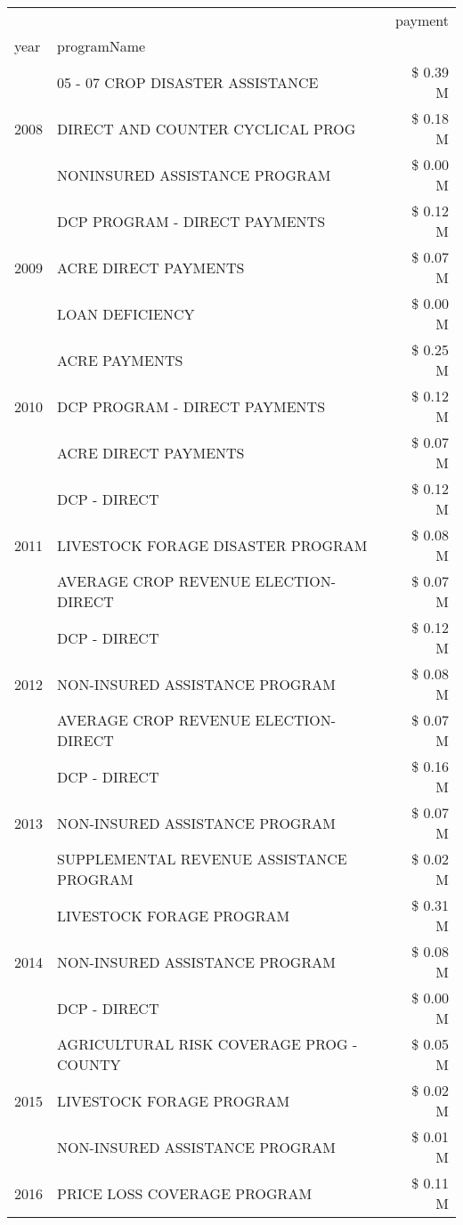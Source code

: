 \begin{tabular}{llr}
\toprule
 &  & payment \\
year & programName &  \\
\midrule
\multirow[t]{3}{*}{2008} & 05 - 07 CROP DISASTER ASSISTANCE & \$ 0.39 M \\
 & DIRECT AND COUNTER CYCLICAL PROG & \$ 0.18 M \\
 & NONINSURED ASSISTANCE PROGRAM & \$ 0.00 M \\
\cline{1-3}
\multirow[t]{3}{*}{2009} & DCP PROGRAM - DIRECT PAYMENTS & \$ 0.12 M \\
 & ACRE DIRECT PAYMENTS & \$ 0.07 M \\
 & LOAN DEFICIENCY & \$ 0.00 M \\
\cline{1-3}
\multirow[t]{3}{*}{2010} & ACRE PAYMENTS & \$ 0.25 M \\
 & DCP PROGRAM - DIRECT PAYMENTS & \$ 0.12 M \\
 & ACRE DIRECT PAYMENTS & \$ 0.07 M \\
\cline{1-3}
\multirow[t]{3}{*}{2011} & DCP - DIRECT & \$ 0.12 M \\
 & LIVESTOCK FORAGE DISASTER PROGRAM & \$ 0.08 M \\
 & AVERAGE CROP REVENUE ELECTION-DIRECT & \$ 0.07 M \\
\cline{1-3}
\multirow[t]{3}{*}{2012} & DCP - DIRECT & \$ 0.12 M \\
 & NON-INSURED ASSISTANCE PROGRAM & \$ 0.08 M \\
 & AVERAGE CROP REVENUE ELECTION-DIRECT & \$ 0.07 M \\
\cline{1-3}
\multirow[t]{3}{*}{2013} & DCP - DIRECT & \$ 0.16 M \\
 & NON-INSURED ASSISTANCE PROGRAM & \$ 0.07 M \\
 & SUPPLEMENTAL REVENUE ASSISTANCE PROGRAM & \$ 0.02 M \\
\cline{1-3}
\multirow[t]{3}{*}{2014} & LIVESTOCK FORAGE PROGRAM & \$ 0.31 M \\
 & NON-INSURED ASSISTANCE PROGRAM & \$ 0.08 M \\
 & DCP - DIRECT & \$ 0.00 M \\
\cline{1-3}
\multirow[t]{3}{*}{2015} & AGRICULTURAL RISK COVERAGE PROG - COUNTY & \$ 0.05 M \\
 & LIVESTOCK FORAGE PROGRAM & \$ 0.02 M \\
 & NON-INSURED ASSISTANCE PROGRAM & \$ 0.01 M \\
\cline{1-3}
\multirow[t]{3}{*}{2016} & PRICE LOSS COVERAGE PROGRAM                   & \$ 0.11 M \\

\end{tabular}
